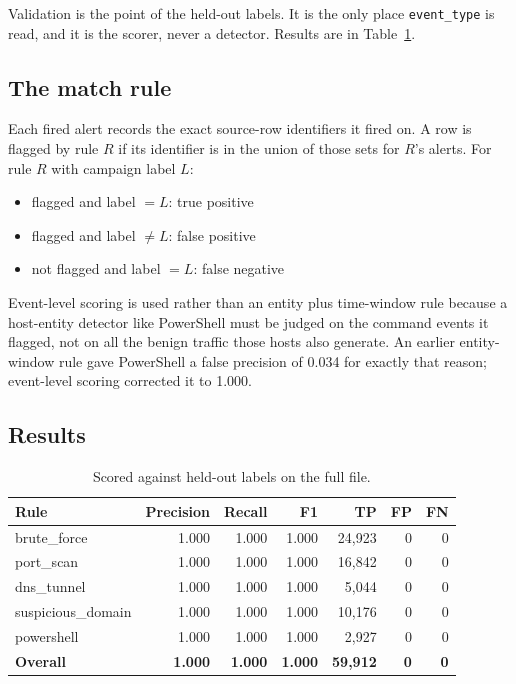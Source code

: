 \documentclass[11pt,a4paper]{article}
\newcommand{\code}[1]{\texttt{#1}}
\begin{document}
Validation is the point of the held-out labels. It is the only place
\code{event\_type} is read, and it is the scorer, never a detector. Results are
in Table~\ref{tab:results}.

\subsection{The match rule}

Each fired alert records the exact source-row identifiers it fired on. A row is
flagged by rule $R$ if its identifier is in the union of those sets for $R$'s
alerts. For rule $R$ with campaign label $L$:

\begin{itemize}
\item flagged and label $=L$: true positive
\item flagged and label $\neq L$: false positive
\item not flagged and label $=L$: false negative
\end{itemize}

Event-level scoring is used rather than an entity plus time-window rule because a
host-entity detector like PowerShell must be judged on the command events it
flagged, not on all the benign traffic those hosts also generate. An earlier
entity-window rule gave PowerShell a false precision of 0.034 for exactly that
reason; event-level scoring corrected it to 1.000.

\subsection{Results}

\begin{table}[h]
\centering
\small
\begin{tabular}{@{}lrrrrrr@{}}
\toprule
Rule & Precision & Recall & F1 & TP & FP & FN \\
\midrule
brute\_force & 1.000 & 1.000 & 1.000 & 24,923 & 0 & 0 \\
port\_scan & 1.000 & 1.000 & 1.000 & 16,842 & 0 & 0 \\
dns\_tunnel & 1.000 & 1.000 & 1.000 & 5,044 & 0 & 0 \\
suspicious\_domain & 1.000 & 1.000 & 1.000 & 10,176 & 0 & 0 \\
powershell & 1.000 & 1.000 & 1.000 & 2,927 & 0 & 0 \\
\midrule
\textbf{Overall} & \textbf{1.000} & \textbf{1.000} & \textbf{1.000} & \textbf{59,912} & \textbf{0} & \textbf{0} \\
\bottomrule
\end{tabular}
\caption{Scored against held-out labels on the full file.}
\label{tab:results}
\end{table}
\end{document}
